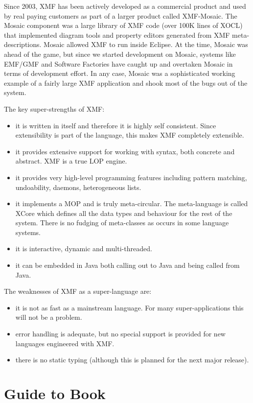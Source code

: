Since 2003, XMF has been actively developed as a commercial product
and used by real paying customers as part of a larger product called
XMF-Mosaic. The Mosaic component was a large library of XMF code (over
100K lines of XOCL) that implemented diagram tools and property editors
generated from XMF meta-descriptions. Mosaic allowed XMF to run inside
Eclipse. At the time, Mosaic was ahead of the game, but since we started
development on Mosaic, systems like EMF/GMF and Software Factories
have caught up and overtaken Mosaic in terms of development effort.
In any case, Mosaic was a sophisticated working example of a fairly
large XMF application and shook most of the bugs out of the system.

The key super-strengths of XMF:

\begin{itemize}
\item it is written in itself and therefore it is highly self consistent.
Since extensibility is part of the language, this makes XMF completely
extensible.
\item it provides extensive support for working with syntax, both concrete
and abstract. XMF is a true LOP engine.
\item it provides very high-level programming features including pattern
matching, undoability, daemons, heterogeneous lists.
\item it implements a MOP and is truly meta-circular. The meta-language
is called XCore which defines all the data types and behaviour for
the rest of the system. There is no fudging of meta-classes as occurs
in some language systems.
\item it is interactive, dynamic and multi-threaded.
\item it can be embedded in Java both calling out to Java and being called
from Java.
\end{itemize}
The weaknesses of XMF as a super-language are:

\begin{itemize}
\item it is not as fast as a mainstream language. For many super-applications
this will not be a problem.
\item error handling is adequate, but no special support is provided for
new languages engineered with XMF.
\item there is no static typing (although this is planned for the next major
release).
\end{itemize}

\section{Guide to Book}

